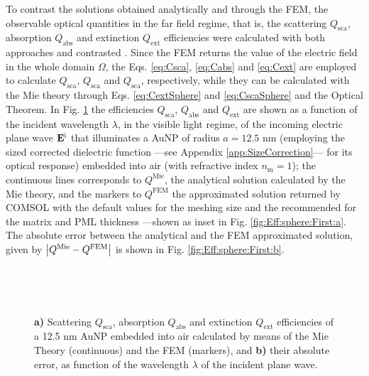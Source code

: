 To contrast the solutions obtained analytically and through the FEM, the observable optical quantities in the far field regime, that is, the scattering $Q_\text{sca}$, absorption $Q_\text{abs}$ and extinction $Q_\text{ext}$ efficiencies were calculated with both approaches and contrasted . Since the FEM returns the value of the electric field in the whole domain $\Omega$, the Eqs. \eqref{eq:Csca}, \eqref{eq:Cabs} and \eqref{eq:Cext} are employed to calculate $Q_\text{sca}$, $Q_\text{sca}$ and $Q_\text{sca}$, respectively, while they can be calculated with the Mie theory through Eqs. \eqref{eq:CextSphere} and \eqref{eq:CscaSphere} and the Optical Theorem. In Fig. \ref{fig:Eff:First:a} the efficiencies  $Q_\text{sca}$,  $Q_\text{abs}$ and $Q_\text{ext}$ are shown as a function of the incident wavelength $\lambda$, in the visible light regime,  of the incoming electric plane wave $\vb{E}^\text{i}$ that illuminates a AuNP of radius $a = 12.5$ nm (employing the sized corrected dielectric function ---see Appendix \ref{app:SizeCorrection}--- for its optical response) embedded into air (with refractive index $n_\text{m} = 1$); the continuous lines corresponds to $Q^\text{Mie}$, the analytical solution calculated by the Mie theory, and the markers to $Q^\text{FEM}$ the approximated solution returned by COMSOL with the default values for the meshing size and the recommended for the matrix and PML thickness ---shown as inset in Fig. \ref{fig:Eff:sphere:First:a}. The absolute error between the analytical and the FEM  approximated solution, given by $\abs{Q^\text{Mie}-Q^\text{FEM}}$ is shown in Fig. \ref{fig:Eff:sphere:First:b}.

\begin{figure}[b!]
 \def\svgwidth{.9\textwidth}
 \footnotesize
 \centering
    \hspace*{-.95\textwidth}
     \begin{subfigure}{\textwidth}\caption{}\label{fig:Eff:First:a}\end{subfigure}\\[11.5em]
    \hspace*{-.95\textwidth}
     \begin{subfigure}{\textwidth}\caption{}\label{fig:Eff:First:b}\end{subfigure}\\[-15em]
\caption[Scattering, Absorption and Extinction Efficiencies of a 5 nm AuNP$@$Air: Analytical and FEM solutions with no optimizatio]{\textbf{a)} Scattering $Q_\text{sca}$, absorption $Q_\text{abs}$ and extinction $Q_\text{ext}$ efficiencies of a 12.5 nm AuNP embedded into air calculated by means of the Mie Theory (continuous) and the FEM (markers), and \textbf{b)} their absolute error, as function of the wavelength $\lambda$ of the incident plane wave.}
\label{fig:Eff:First}
\end{figure}
%



